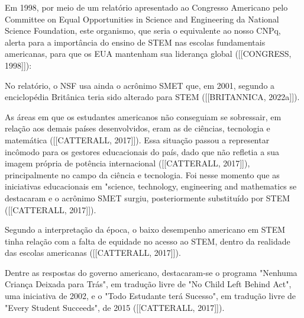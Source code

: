 Em 1998, por meio de um relatório apresentado ao Congresso Americano pelo Committee on Equal Opportunities in Science and Engineering da National Science Foundation, este organismo, que seria o equivalente ao nosso CNPq, alerta para a importância do ensino de STEM nas escolas fundamentais americanas, para que os EUA mantenham sua liderança global  ([[CONGRESS, 1998]]):


\noindent\begin{center}\mbox{\centering{}}\end{center}


No relatório, o NSF usa ainda o acrônimo SMET que, em 2001, segundo a enciclopédia Britânica teria sido alterado para STEM ([[BRITANNICA, 2022a]]).

As áreas em que os estudantes americanos não conseguiam se sobressair, em relação aos demais países desenvolvidos, eram as de ciências, tecnologia e matemática  ([[CATTERALL, 2017]]). Essa situação passou a representar incômodo para os gestores educacionais do país, dado que não refletia a sua imagem própria de potência internacional  ([[CATTERALL, 2017]]), principalmente no campo da ciência e tecnologia. Foi nesse momento que as iniciativas educacionais em "science, technology, engineering and mathematics se destacaram e o acrônimo SMET surgiu, posteriormente substituído por STEM  ([[CATTERALL, 2017]]).

Segundo a interpretação da época, o baixo desempenho americano em STEM tinha relação com a falta de equidade no acesso ao STEM, dentro da realidade das escolas americanas  ([[CATTERALL, 2017]]).

Dentre as respostas do governo americano, destacaram-se o programa "Nenhuma Criança Deixada para Trás", em tradução livre de "No Child Left Behind Act", uma iniciativa de 2002, e o "Todo Estudante terá Sucesso", em tradução livre de "Every Student Succeeds", de 2015  ([[CATTERALL, 2017]]).

